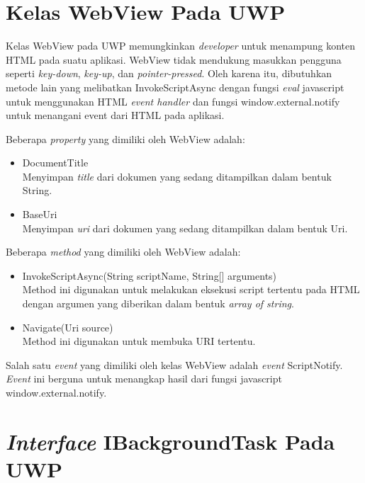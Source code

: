\section{Kelas WebView Pada UWP}
\label{sec:webview}

Kelas WebView pada UWP memungkinkan \textit{developer} untuk menampung konten HTML pada suatu aplikasi\cite{WinAPI:2016}. WebView tidak mendukung masukkan pengguna seperti \textit{key-down}, \textit{key-up}, dan \textit{pointer-pressed}. Oleh karena itu, dibutuhkan metode lain yang melibatkan InvokeScriptAsync dengan fungsi \textit{eval} javascript untuk menggunakan HTML \textit{event handler} dan fungsi window.external.notify untuk menangani event dari HTML pada aplikasi.

Beberapa \textit{property} yang dimiliki oleh WebView adalah:

\begin{itemize}
    \item{DocumentTitle\\Menyimpan \textit{title} dari dokumen yang sedang ditampilkan dalam bentuk String.}
    \item{BaseUri\\Menyimpan \textit{uri} dari dokumen yang sedang ditampilkan dalam bentuk Uri.}
\end{itemize}

Beberapa \textit{method} yang dimiliki oleh WebView adalah:

\begin{itemize}
    \item{InvokeScriptAsync(String scriptName, String[] arguments)\\Method ini digunakan untuk melakukan eksekusi script tertentu pada HTML dengan argumen yang diberikan dalam bentuk \textit{array of string}.}
    \item{Navigate(Uri source)\\Method ini digunakan untuk membuka URI tertentu.}
\end{itemize}

Salah satu \textit{event} yang dimiliki oleh kelas WebView adalah \textit{event} ScriptNotify. \textit{Event} ini berguna untuk menangkap hasil dari fungsi javascript window.external.notify.



\section{\textit{Interface} IBackgroundTask Pada UWP}
\label{sec:ibackgroundtask}

